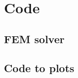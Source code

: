 \documentclass[english,12pt,a4paper]{book}
\title{}
\author{}
\date{}
\begin{document}
















\appendix
\chapter{Code\label{app:Code}}
\section{FEM solver}

\section{Code to plots}

\end{document}

